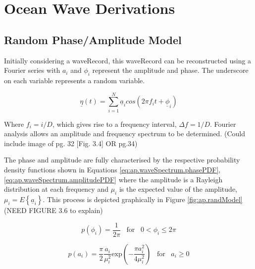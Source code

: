 \appendix
\chapter{Ocean Wave Derivations}
\label{ap:oceanWaves}

\section{Random Phase/Amplitude Model} \label{sec:ap.oceanWaves.randModel}

Initially considering a \gls{waveRecord}, this \gls{waveRecord} can be reconstructed using a Fourier series with $a_{i}$ and $\phi_{i}$ represent the amplitude and phase. The underscore on each variable represents a random variable.

\begin{equation} \label{eq:ap.waveSpectrum.fourierSeries}
    \underline{\eta}(t) = \sum_{i=1}^{N}\underline{a}_{i}cos(2\pi f_{i}t + \underline{\phi}_{i})
\end{equation}

Where $f_{i}=i/D$, which gives rise to a frequency interval, $\Delta f=1/D$. Fourier analysis allows an amplitude and frequency spectrum to be determined.
(Could include image of pg. 32 [Fig. 3.4] OR pg.34)

The phase and amplitude are fully characterised by the respective probability density functions shown in Equations \ref{eq:ap.waveSpectrum.phasePDF},\ref{eq:ap.waveSpectrum.amplitudePDF} where the amplitude is a Rayleigh distribution at each frequency and $\mu_{i}$ is the expected value of the amplitude, $\mu_{i}= E\left \{  \underline{a}_{i}\right \}$. This process is depicted graphically in Figure \ref{fig:ap.randModel}
(NEED FIGURE 3.6 to explain)


\begin{equation} \label{eq:ap.waveSpectrum.phasePDF}
    p(\phi_{i}) = \frac{1}{2\pi} \; \; \; \text{for} \; \; \;  0 < \phi_{i} \leq 2\pi
\end{equation}

\begin{equation} \label{eq:ap.waveSpectrum.amplitudePDF}
    p(a_{i}) = \frac{\pi}{2}\frac{a_{i}}{\mu^{2}_{i}}\text{exp}\left (-\frac{\pi a^{2}_{i}}{4\mu^{2}_{i}}\right ) \; \; \; \text{for} \; \; \;  a_{i} \geq 0
\end{equation}

